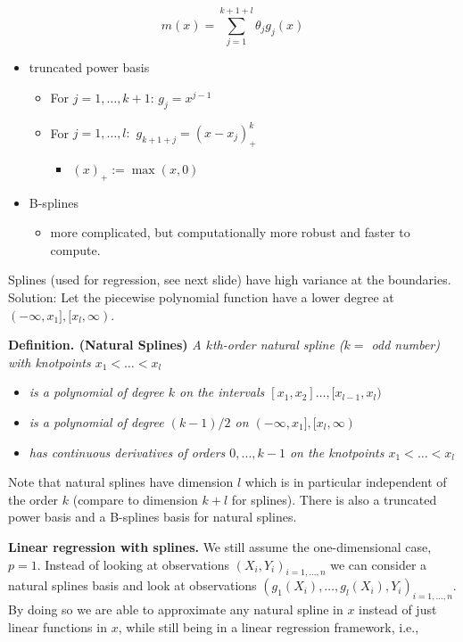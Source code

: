 \documentclass[
]{book}
\providecommand{\tightlist}{%
  \setlength{\itemsep}{0pt}\setlength{\parskip}{0pt}}
\begin{document}
\[
m(x)=\sum_{j=1}^{k+1+l}\theta_jg_j(x)
\]

\begin{itemize}
\tightlist
\item
  truncated power basis

  \begin{itemize}
  \tightlist
  \item
    For \(j=1,\dots, k+1\): \(g_{j}=x^{j-1}\)
  \item
    For \(j=1,\dots,l:\) \(g_{k+1+j}=(x-x_j)^k_+\)

    \begin{itemize}
    \tightlist
    \item
      \((x)_+:= \max(x,0)\)
    \end{itemize}
  \end{itemize}
\item
  B-splines

  \begin{itemize}
  \tightlist
  \item
    more complicated, but computationally more robust and faster to compute.
  \end{itemize}
\end{itemize}

Splines (used for regression, see next slide) have high variance at the boundaries. Solution: Let the piecewise polynomial function have a lower degree at \((-\infty,x_1],[x_l,\infty)\).

\textbf{Definition. (Natural Splines)} \emph{A \(k\)th-order natural spline (\(k=\) odd number) with knotpoints \(x_1 <\dots<x_l\)}

\begin{itemize}
\tightlist
\item
  \emph{is a polynomial of degree \(k\) on the intervals \([x_1,x_2]\dots,[x_{l-1},x_l)\)}
\item
  \emph{is a polynomial of degree \((k-1)/2\) on \((-\infty,x_1],[x_l,\infty)\)}
\item
  \emph{has continuous derivatives of orders \(0,...,k-1\) on the knotpoints \(x_1 <\dots<x_l\)}
\end{itemize}

Note that natural splines have dimension \(l\) which is in particular independent of the order \(k\) (compare to dimension \(k+l\) for splines). There is also a truncated power basis and a B-splines basis for natural splines.

\textbf{Linear regression with splines.} We still assume the one-dimensional case, \(p=1\). Instead of looking at observations \((X_i,Y_i)_{i=1,\dots,n}\) we can consider a natural splines basis and look at observations \((g_1(X_i), \dots, g_l(X_i), Y_i)_{i=1,\dots,n}.\) By doing so we are able to approximate any natural spline in \(x\) instead of just linear functions in \(x\), while still being in a linear regression framework, i.e.,
\end{document}
